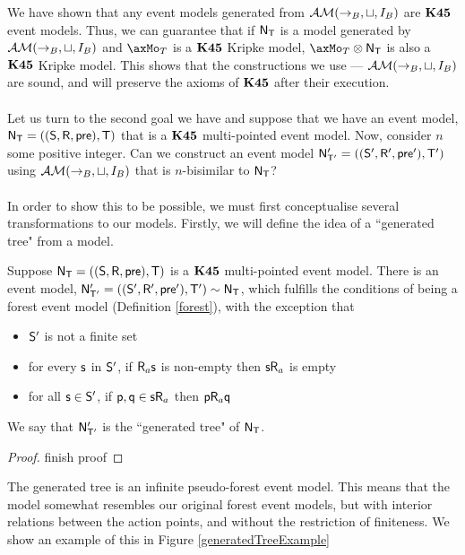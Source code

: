 \newcommand{\EM}{\ensuremath{\eventClass}}

We have shown that any event models generated from $\EM(\to_B,\sqcup, I_B)$ are
$\bf K45$ event models.
Thus, we can guarantee that if $\mathrm{\mathsf{N}}_\mathrm{\mathsf{T}}$ is a model generated by
$\EM(\to_B,\sqcup,I_B)$ and $\axMo_T$ is a $\bf K45$ Kripke model, $\axMo_T
\otimes \evM_\evT$ is also a $\bf K45$ Kripke model.
This shows that the constructions we use --- $\EM(\to_B, \sqcup, I_B)$ are
sound, and will preserve the axioms of $\bf K45$ after their execution.\\
\\
Let us turn to the second goal we have and suppose that we have an event model, $\mathrm{\mathsf{N}}_\mathrm{\mathsf{T}}
= ((\mathrm{\mathsf{S}},\mathrm{\mathsf{R}},\mathrm{\mathsf{pre}}),\mathrm{\mathsf{T}})$ that is a $\bf K45$ multi-pointed event model.
Now, consider $n$ some positive integer.
Can we construct an event model $\mathrm{\mathsf{N}}'_{\mathrm{\mathsf{T}}'} = ((\mathrm{\mathsf{S}}',\mathrm{\mathsf{R}}',\mathrm{\mathsf{pre}}'),\mathrm{\mathsf{T}}')$
using $\EM(\to_B,\sqcup,I_B)$ that is $n$-bisimilar to $\mathrm{\mathsf{N}}_\mathrm{\mathsf{T}}$?\\
\\
In order to show this to be possible, we must first conceptualise several
transformations to our models.
Firstly, we will define the idea of a ``generated tree" from a model.

\begin{lemma} \label{generateTree}
  Suppose $\mathrm{\mathsf{N}}_\mathrm{\mathsf{T}} = ((\mathrm{\mathsf{S}},\mathrm{\mathsf{R}},\mathrm{\mathsf{pre}}),\mathrm{\mathsf{T}})$ is a $\bf K45$ multi-pointed
  event model.
  There is an event model, $\mathrm{\mathsf{N}}'_{\mathrm{\mathsf{T}}'} = ((\mathrm{\mathsf{S}}',\mathrm{\mathsf{R}}',\mathrm{\mathsf{pre}}'),\mathrm{\mathsf{T}}') \sim
  \mathrm{\mathsf{N}}_\mathrm{\mathsf{T}}$, which fulfills the conditions of being a forest event model
  (Definition \ref{forest}), with the exception that
  \begin{itemize}
    \item $\mathrm{\mathsf{S}}'$ is not a finite set
    \item for every $\mathrm{\mathsf{s}}$ in $\mathrm{\mathsf{S}}'$, if $\mathrm{\mathsf{R}}_a \mathrm{\mathsf{s}}$ is non-empty then
    $\mathrm{\mathsf{s}} \mathrm{\mathsf{R}}_a$ is empty
    \item for all $\mathrm{\mathsf{s}} \in \mathrm{\mathsf{S}}'$, if $\mathrm{\mathsf{p}}, \mathrm{\mathsf{q}} \in \mathrm{\mathsf{s}} \mathrm{\mathsf{R}}_a$ then $\mathrm{\mathsf{p}}
    \mathrm{\mathsf{R}}_a \mathrm{\mathsf{q}}$
  \end{itemize}
  We say that $\mathrm{\mathsf{N}}'_{\mathrm{\mathsf{T}}'}$ is the ``generated tree" of $\mathrm{\mathsf{N}}_\mathrm{\mathsf{T}}$.
\end{lemma}
\begin{proof}
  \FIXME finish proof
\end{proof}

The generated tree is an infinite pseudo-forest event model.
This means that the model somewhat resembles our original forest event models,
but with interior relations between the action points, and without the
restriction of finiteness.
We show an example of this in Figure \ref{generatedTreeExample}

